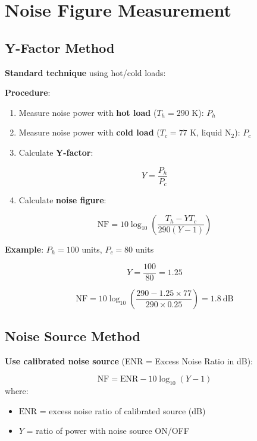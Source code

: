 \section{Noise Figure Measurement}

\subsection{Y-Factor Method}

\textbf{Standard technique} using hot/cold loads:

\textbf{Procedure}:
\begin{enumerate}
\item Measure noise power with \textbf{hot load} ($T_h = 290$ K): $P_h$
\item Measure noise power with \textbf{cold load} ($T_c = 77$ K, liquid N$_2$): $P_c$
\item Calculate \textbf{Y-factor}:
\end{enumerate}

\begin{equation}
Y = \frac{P_h}{P_c}
\end{equation}

\begin{enumerate}
\setcounter{enumi}{3}
\item Calculate \textbf{noise figure}:
\end{enumerate}

\begin{equation}
\text{NF} = 10\log_{10}\left(\frac{T_h - YT_c}{290(Y-1)}\right)
\end{equation}

\textbf{Example}: $P_h = 100$ units, $P_c = 80$ units

\begin{equation}
Y = \frac{100}{80} = 1.25
\end{equation}

\begin{equation}
\text{NF} = 10\log_{10}\left(\frac{290 - 1.25 \times 77}{290 \times 0.25}\right) = 1.8~\text{dB}
\end{equation}

\subsection{Noise Source Method}

\textbf{Use calibrated noise source} (ENR = Excess Noise Ratio in dB):

\begin{equation}
\text{NF} = \text{ENR} - 10\log_{10}(Y - 1)
\end{equation}
where:
\begin{itemize}
\item $\text{ENR}$ = excess noise ratio of calibrated source (dB)
\item $Y$ = ratio of power with noise source ON/OFF
\end{itemize}

